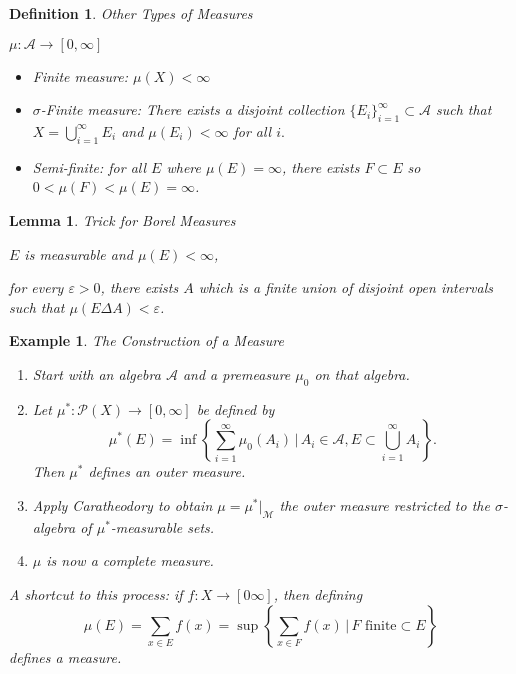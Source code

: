 \documentclass[12pt]{Qual}
\newtheorem{example}{Example}
\newtheorem{definition}{Definition}
\newtheorem{lemma}{Lemma}
\begin{document}
\vspace{0.25cm}
\begin{definition}{\Large\textit{Other Types of Measures}}
$\,$

$\mu:\mathscr{A}\to[0,\infty]$
\begin{itemize}
\setlength\itemsep{-0.1em}
\renewcommand\labelitemi{\faCoffee}
    \item Finite measure: $\mu(X)<\infty$
    \item $\sigma$-Finite measure: There exists a disjoint collection $\{E_i\}_{i=1}^\infty\subset\mathscr{A}$ such that $\displaystyle X=\bigcup_{i=1}^\infty E_i$ and $\mu(E_i)<\infty$ for all $i.$
    \item Semi-finite: for all $E$ where $\mu(E)=\infty$, there exists $F\subset E$ so $0<\mu(F)<\mu(E)=\infty$.
\end{itemize}

\end{definition}
\vspace{0.5cm}
\begin{lemma}{\Large\textit{Trick for Borel Measures}}

 $E$ is measurable and $\mu(E)<\infty$,

\hspace{0.1cm}\begin{minipage}{0.85\textwidth}
\vspace{0.45cm}
for every $\varepsilon>0$, there exists $A$ which is a finite union of disjoint open intervals such that $\mu(E\Delta A)<\varepsilon$.
\end{minipage}

\end{lemma}
\vspace{0.5cm}
\begin{example}{\Large\textit{The Construction of a Measure}}

\begin{enumerate}[label=(\arabic*)]
\setlength\itemsep{-0.1em}
    \item Start with an algebra $\mathscr{A}$ and a premeasure $\mu_0$ on that algebra.
    \item Let $\mu^*:\mathscr{P}(X)\to[0,\infty]$ be defined by $$\mu^*(E)=\inf\left\{\sum_{i=1}^\infty\mu_0(A_i)\,|\, A_i\in\mathscr{A}, E\subset\bigcup_{i=1}^\infty A_i\right\}.$$ Then $\mu^*$ defines an outer measure.
    \item Apply Caratheodory to obtain $\mu=\mu^*|_{\mathscr{M}}$ the outer measure restricted to the $\sigma$-algebra of $\mu^*$-measurable sets.
    \item $\mu$ is now a complete measure.
\end{enumerate}

A shortcut to this process: if $f:X\to[0\infty]$, then defining $$\mu(E)=\sum_{x\in E}f(x)=\sup\left\{\sum_{x\in F}f(x)\,|\, F\text{ finite}\subset E\right\}$$ defines a measure.

\end{example}
\end{document}
